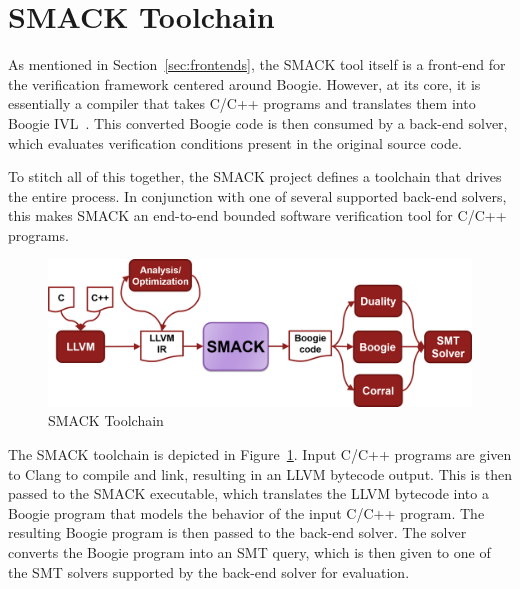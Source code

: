 \section{SMACK Toolchain}\label{sec:smacktoolchain}
As mentioned in Section~\ref{sec:frontends}, the SMACK tool itself is
a front-end for the verification framework centered around Boogie.
However, at its core, it is essentially a compiler that takes C/C++
programs and translates them into Boogie IVL~\cite{smack}.  This
converted Boogie code is then consumed by a back-end solver, which
evaluates verification conditions present in the original source
code.

To stitch all of this together, the SMACK project defines a toolchain
that drives the entire process.  In conjunction with one of several
supported back-end solvers, this makes SMACK an end-to-end bounded
software verification tool for C/C++ programs.

\begin{figure}[!h]
  \caption{SMACK Toolchain}
  \label{fig:SMACKToolchain}
  \includegraphics[width=1\textwidth]{SmackToolchain.png} 
\end{figure}

The SMACK toolchain is depicted in Figure~\ref{fig:SMACKToolchain}.
Input C/C++ programs are given to Clang to compile and link, resulting
in an LLVM bytecode output.  This is then passed to the SMACK
executable, which translates the LLVM bytecode into a Boogie program
that models the behavior of the input C/C++ program.  The resulting
Boogie program is then passed to the back-end solver.  The solver
converts the Boogie program into an SMT query, which is then given to
one of the SMT solvers supported by the back-end solver for
evaluation. 

